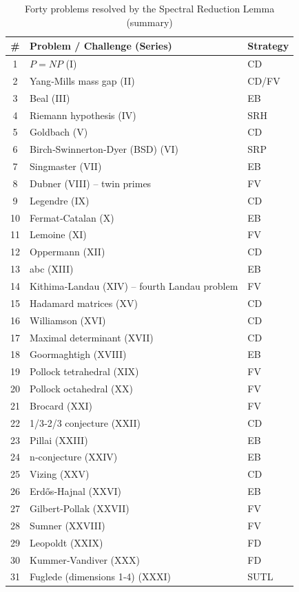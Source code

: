 \documentclass[11pt,a4paper]{article}
\begin{document}
\begin{center}
\small
\begin{longtable}{@{}cll@{}}
\caption{Forty problems resolved by the Spectral Reduction Lemma (summary)}\\
\toprule
\# & Problem / Challenge (Series) & Strategy \\
\midrule
1 & \(P = NP\) (I) & CD \\
2 & Yang‑Mills mass gap (II) & CD/FV \\
3 & Beal (III) & EB \\
4 & Riemann hypothesis (IV) & SRH \\
5 & Goldbach (V) & CD \\
6 & Birch‑Swinnerton‑Dyer (BSD) (VI) & SRP \\
7 & Singmaster (VII) & EB \\
8 & Dubner (VIII) – twin primes & FV \\
9 & Legendre (IX) & CD \\
10 & Fermat‑Catalan (X) & EB \\
11 & Lemoine (XI) & FV \\
12 & Oppermann (XII) & CD \\
13 & abc (XIII) & EB \\
14 & Kithima‑Landau (XIV) – fourth Landau problem & FV \\
15 & Hadamard matrices (XV) & CD \\
16 & Williamson (XVI) & CD \\
17 & Maximal determinant (XVII) & CD \\
18 & Goormaghtigh (XVIII) & EB \\
19 & Pollock tetrahedral (XIX) & FV \\
20 & Pollock octahedral (XX) & FV \\
21 & Brocard (XXI) & FV \\
22 & 1/3‑2/3 conjecture (XXII) & CD \\
23 & Pillai (XXIII) & EB \\
24 & n‑conjecture (XXIV) & EB \\
25 & Vizing (XXV) & CD \\
26 & Erdős‑Hajnal (XXVI) & EB \\
27 & Gilbert‑Pollak (XXVII) & FV \\
28 & Sumner (XXVIII) & FV \\
29 & Leopoldt (XXIX) & FD \\
30 & Kummer‑Vandiver (XXX) & FD \\
31 & Fuglede (dimensions 1‑4) (XXXI) & SUTL \\

\end{longtable}
\end{center}
\end{document}

